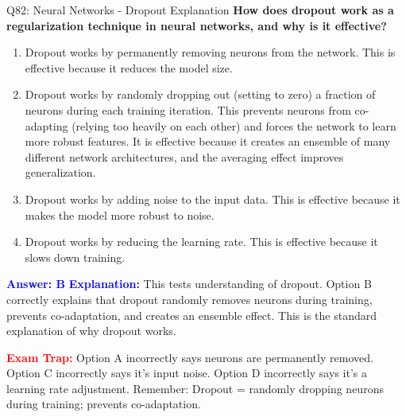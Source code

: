 \documentclass[8pt]{beamer}
\begin{document}
	\begin{frame}{Q82: Neural Networks - Dropout Explanation}
		\fontsize{6.5}{7.5}\selectfont
		\textbf{How does dropout work as a regularization technique in neural networks, and why is it effective?}
		
		\begin{enumerate}
			\item Dropout works by permanently removing neurons from the network. This is effective because it reduces the model size.
			\item Dropout works by randomly dropping out (setting to zero) a fraction of neurons during each training iteration. This prevents neurons from co-adapting (relying too heavily on each other) and forces the network to learn more robust features. It is effective because it creates an ensemble of many different network architectures, and the averaging effect improves generalization.
			\item Dropout works by adding noise to the input data. This is effective because it makes the model more robust to noise.
			\item Dropout works by reducing the learning rate. This is effective because it slows down training.
		\end{enumerate}
		
		\vspace{0.1cm}
		\textcolor{blue}{\textbf{Answer: B}}
		\vspace{0.1cm}
		\textcolor{blue}{\textbf{Explanation:}} This tests understanding of dropout. Option B correctly explains that dropout randomly removes neurons during training, prevents co-adaptation, and creates an ensemble effect. This is the standard explanation of why dropout works.
		
		\textcolor{red}{\textbf{Exam Trap:}} Option A incorrectly says neurons are permanently removed. Option C incorrectly says it's input noise. Option D incorrectly says it's a learning rate adjustment. Remember: Dropout = randomly dropping neurons during training; prevents co-adaptation.
	\end{frame}
	
\end{document}
